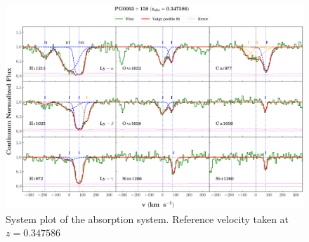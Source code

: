 \begin{landscape}

\thispagestyle{empty}

\begin{figure}
\centering
\vspace{-20mm}
\hspace*{-35mm}
\includegraphics[width=1.25\linewidth]{Figures/PG0003+158_z=0.347586_sys_plot.png}
\caption{System plot of the absorption system. Reference velocity taken at $z=0.347586$}
\label{fig:sys_plot}
\end{figure}

\end{landscape}



                                               
                                               

